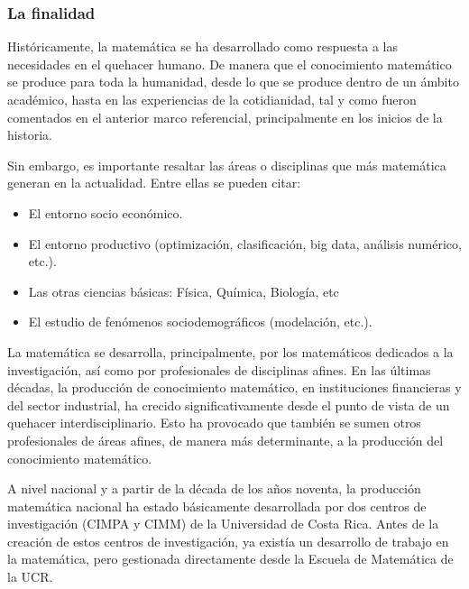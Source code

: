 \subsubsection{La finalidad}

Históricamente, la matemática se ha desarrollado como respuesta a las necesidades en el quehacer humano. De manera que el conocimiento matemático se produce para toda la humanidad, desde lo que se produce dentro de un ámbito académico, hasta en las experiencias de la cotidianidad, tal y como fueron comentados en el anterior marco referencial, principalmente en los
inicios de la historia.

Sin embargo, es importante resaltar las áreas o disciplinas que más matemática generan en la actualidad. Entre ellas se pueden citar: 

\begin{itemize}
    
    \color{blue} \item \color{black} El entorno socio económico. 

    
     \color{blue} \item \color{black} El entorno productivo (optimización, clasificación, big data, análisis numérico, etc.).  
     
    \color{blue} \item \color{black}  Las otras ciencias básicas: Física, Química, Biología, etc
    
     \color{blue} \item \color{black} El estudio de fenómenos sociodemográficos (modelación, etc.).
     
     \end{itemize}
     
La matemática se desarrolla, principalmente, por los matemáticos dedicados a la investigación, así como por profesionales de disciplinas afines. En las últimas décadas, la producción de conocimiento matemático, en instituciones financieras y del sector industrial, ha crecido significativamente desde el punto de vista de un quehacer interdisciplinario. Esto ha provocado que también se sumen otros profesionales de áreas afines, de manera más determinante, a la producción del conocimiento matemático.

A nivel nacional y a partir de la década de los años noventa, la producción matemática nacional ha estado básicamente desarrollada por dos centros de investigación (CIMPA y CIMM) de la Universidad de Costa Rica. Antes de la creación de estos centros de investigación, ya existía un desarrollo de trabajo en la matemática, pero gestionada directamente desde la Escuela de Matemática de la UCR. 

